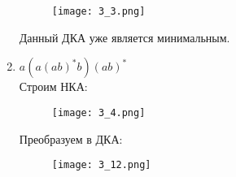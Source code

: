 \documentclass[12pt, a4paper]{article}
\begin{document}
\begin{enumerate}
\begin{comment}
    "" -> "{q1q2q5q9}"
    "{q1q2q5q9}" -> "{q3,q7,q10}" [label="a"]
    "{q3,q7,q10}" -> "{q4q8}" [label="b"]
    "{q4q8}" -> "{q3,q7,q9,q10}" [label="a"]
    "{q3,q7,q9,q10}" -> "{q4q8}" [label="b"]
    "{q3,q7,q9,q10}" -> "{q3,q7,q10}" [label="a"]
}
\end{comment}
    \begin{figure}[H]
        \centering
        \texttt{[image: 3\_3.png]}
    \end{figure}
    
Данный ДКА уже является минимальным.

    \item \(a(a(ab)^*b)(ab)^*\)
\\Строим НКА:
\begin{comment}
digraph {
    rankdir="LR"
    "" [shape=point]
    q1 [shape=circle]
    q2 [shape=circle]
    q3 [shape=circle]
    q4 [shape=circle]
    q5 [shape=circle]
    q6 [shape=doublecircle]
    q7 [shape=circle]
    q8 [shape=doublecircle]

    "" -> q1
    q1 -> q2 [label="a"]
    q1 -> q8 [label="a"]
    q2 -> q3 [label="a"]
    q3 -> q4 [label="a"]
    q3 -> q6 [label="b"]
    q4 -> q5 [label="b"]
    q5 -> q4 [label="a"]
    q5 -> q6 [label="b"]
    q6 -> q7 [label="a"]
    q7 -> q8 [label="b"]
    q8 -> q7 [label="a"]
}
\end{comment}

    \begin{figure}[H]
        \centering
        \texttt{[image: 3\_4.png]}
    \end{figure}
    
Преобразуем в ДКА:

\begin{comment}
digraph {
    rankdir="LR"
    "" [shape=point]
    q1 [shape=circle]
    "{q2q8}" [shape=doublecircle]
    "{q3q7}" [shape=circle]
    "{q6q8}" [shape=doublecircle]
    q4 [shape=circle]
    q5 [shape=circle]
    q6 [shape=doublecircle]

    "" -> q1
    q1 -> "{q2q8}" [label="a"]
    "{q2q8}" -> "{q3q7}" [label="a"]
    "{q3q7}" -> q4 [label="a"]
    "{q3q7}" -> {q6q8} [label="b"]
    q4 -> q5 [label="b"]
    q5 -> q4 [label="a"]
    q5 -> q6 [label="b"]
    q6 -> "{q3q7}" [label="a"]
    "{q3q7}" -> "{q6q8}" [label="b"]
    "{q6q8}" -> "{q3q7}"
}
\end{comment}

    \begin{figure}[H]
        \centering
        \texttt{[image: 3\_12.png]}
    \end{figure}


\end{enumerate}
\end{document}
